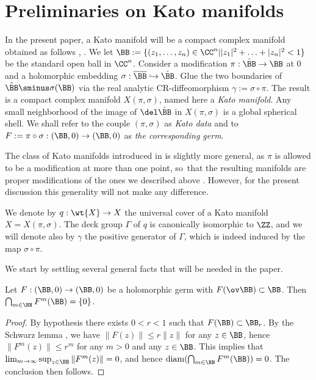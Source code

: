 \section{Preliminaries on Kato manifolds}\label{prel}

In the present paper, a Kato manifold will be a compact complex manifold obtained as follows \cite{kato}, \cite{dl84}. We let $\BB:=\{(z_1, \ldots, z_n) \in \CC^n | |z_1|^2+\ldots+|z_n|^2 < 1\}$ be the standard open ball in $\CC^n$. Consider a modification $\pi: \hat{\BB} \to \BB$ at $0$ and a holomorphic embedding $\sigma: \overline{\BB} \hookrightarrow \hat{\BB}$. Glue the two boundaries of $\hat{\BB} \sminus \sigma(\BB)$ via the real analytic CR-diffeomorphism $\gamma:=\sigma \circ \pi$. The result is a compact complex manifold $X(\pi, \sigma)$, named here a \textit{Kato manifold}. Any small neighborhood of the image of $\del\hat\BB$ in $X(\pi,\sigma)$ is a global spherical shell. We shall refer to the couple $(\pi, \sigma)$ as \emph{Kato data} and to $F:=\pi \circ \sigma : (\BB, 0) \to (\BB, 0)$ as \emph{the corresponding germ}.

The class of Kato manifolds introduced in \cite{kato} is slightly more general, as $\pi$ is allowed to be a modification at more than one point, so~that the resulting manifolds are proper modifications of the ones we described above \cite[Lem.\,2.7, Part\,I]{dl84}. However, for the present discussion this generality will not make any difference.

We denote by $q:\wt{X}\to X$ the universal cover of a Kato manifold $X=X(\pi,\sigma)$. The deck group $\Gamma$ of $q$ is canonically isomorphic to $\ZZ$, and we will denote also by $\gamma$ the positive generator of $\Gamma$, which is indeed induced by the map $\sigma\circ\pi$.

We start by settling several general facts that will be needed in the paper.

\begin{lemma}\label{interFB}
Let $F:(\BB,0)\to (\BB,0)$ be a holomorphic germ with $F(\ov\BB)\subset\BB$. Then $\bigcap_{m\in\NN}F^m(\BB)=\{0\}$.
\end{lemma}
\begin{proof}
By hypothesis there exists $0<r<1$ such that $F(\BB)\subset\BB_r$. By the Schwarz lemma \cite[Th.\,6]{shabat}, we have $\|F(z)\|\leq r\|z\|$ for any $z\in\BB$, hence $\|F^m(z)\|\leq r^m$ for any $m>0$ and any $z\in\BB$. This implies that $\lim_{m\to\infty}\sup_{z\in\BB}\|F^m(z)\|=0$, and hence $\mathrm{diam}(\bigcap_{m\in\NN}F^m(\BB))=0$. The conclusion then follows.
\end{proof}

